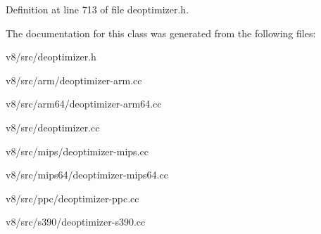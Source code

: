 Definition at line 713 of file deoptimizer.\+h.



The documentation for this class was generated from the following files\+:\begin{DoxyCompactItemize}
\item 
v8/src/deoptimizer.\+h\item 
v8/src/arm/deoptimizer-\/arm.\+cc\item 
v8/src/arm64/deoptimizer-\/arm64.\+cc\item 
v8/src/deoptimizer.\+cc\item 
v8/src/mips/deoptimizer-\/mips.\+cc\item 
v8/src/mips64/deoptimizer-\/mips64.\+cc\item 
v8/src/ppc/deoptimizer-\/ppc.\+cc\item 
v8/src/s390/deoptimizer-\/s390.\+cc\end{DoxyCompactItemize}
